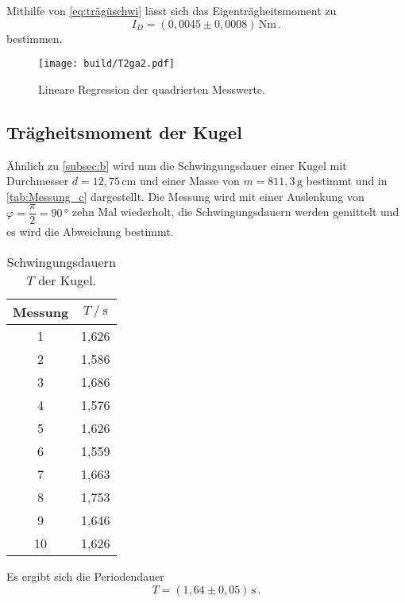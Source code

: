 Mithilfe von \eqref{eq:trägüschwi} lässt sich das Eigenträgheitsmoment zu
\begin{equation*}
  I_D = (0,0045 \pm 0,0008) \,\unit{\newton\meter} \,.
\end{equation*}
bestimmen.

\begin{figure}[H]
  \centering
  \texttt{[image: build/T2ga2.pdf]}
  \caption{Lineare Regression der quadrierten Messwerte.}
  \label{fig:T2ga2}
\end{figure}

\subsection{Trägheitsmoment der Kugel}
\label{subsec:c}

Ähnlich zu \autoref{subsec:b} wird nun die Schwingungsdauer einer Kugel mit Durchmesser $d = 12,75 \, \unit{\centi\meter}$ und einer Masse von $m = 811,3 \,\unit{\gram}$ bestimmt und in \autoref{tab:Messung_c} dargestellt.
Die Messung wird mit einer Auslenkung von $\varphi = \dfrac{π}{2} = 90 \,\unit{\degree}$ zehn Mal wiederholt, die Schwingungsdauern werden gemittelt und es wird die Abweichung bestimmt.

\begin{table}[H] %
  \centering
  \begin{tabular}{S[table-format=2.0] S[table-format=1.2]}
      \toprule
      {Messung} & {$T \mathbin{/} \unit{\second}$}\\
        & 1,626 \\
          2  & 1,586 \\
          3  & 1,686 \\
          4  & 1,576 \\  
          5  & 1,626 \\
          6  & 1,559 \\
          7  & 1,663 \\
          8  & 1,753 \\
          9  & 1,646 \\
          10 & 1,626 \\
      \bottomrule
  \end{tabular}
  \caption{Schwingungsdauern $T$ der Kugel.}
  \label{tab:Messung_c}
\end{table}
Es ergibt sich die Periodendauer
\begin{equation*}
  T= (1,64 \pm 0,05) \, \unit{\second} \,.
\end{equation*}

